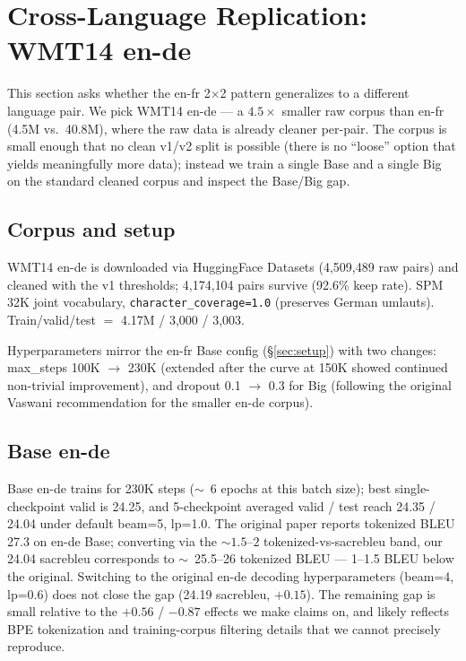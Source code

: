 \section{Cross-Language Replication: WMT14 en-de}
\label{sec:ende}

This section asks whether the en-fr 2$\times$2 pattern generalizes to a different language pair. We pick WMT14 en-de --- a $4.5\times$ smaller raw corpus than en-fr (4.5M vs.\ 40.8M), where the raw data is already cleaner per-pair. The corpus is small enough that no clean v1/v2 split is possible (there is no ``loose'' option that yields meaningfully more data); instead we train a single Base and a single Big on the standard cleaned corpus and inspect the Base/Big gap.

\subsection{Corpus and setup}
WMT14 en-de is downloaded via HuggingFace Datasets (4{,}509{,}489 raw pairs) and cleaned with the v1 thresholds; 4{,}174{,}104 pairs survive (92.6\% keep rate). SPM 32K joint vocabulary, \texttt{character\_coverage=1.0} (preserves German umlauts). Train/valid/test $=$ 4.17M / 3{,}000 / 3{,}003.

Hyperparameters mirror the en-fr Base config (\S\ref{sec:setup}) with two changes: max\_steps 100K $\rightarrow$ 230K (extended after the curve at 150K showed continued non-trivial improvement), and dropout 0.1 $\rightarrow$ 0.3 for Big (following the original Vaswani recommendation for the smaller en-de corpus).

\subsection{Base en-de}
Base en-de trains for 230K steps ($\sim$~6 epochs at this batch size); best single-checkpoint valid is 24.25, and 5-checkpoint averaged valid / test reach 24.35 / 24.04 under default beam=5, lp=1.0. The original paper reports tokenized BLEU 27.3 on en-de Base; converting via the ${\sim}1.5$--$2$ tokenized-vs-sacrebleu band, our 24.04 sacrebleu corresponds to $\sim$~25.5--26 tokenized BLEU --- 1--1.5 BLEU below the original. Switching to the original en-de decoding hyperparameters (beam=4, lp=0.6) does not close the gap (24.19 sacrebleu, $+0.15$). The remaining gap is small relative to the $+0.56$ / $-0.87$ effects we make claims on, and likely reflects BPE tokenization and training-corpus filtering details that we cannot precisely reproduce.

